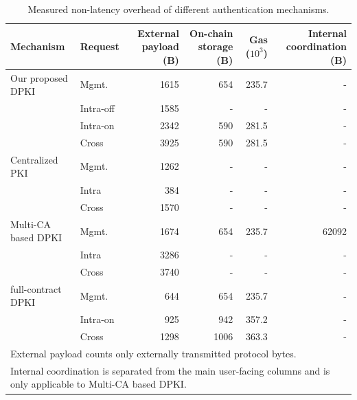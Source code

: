 \begin{table}[t]
\centering
\caption{Measured non-latency overhead of different authentication mechanisms.}
\label{tab:resource-overhead-v2}
\scriptsize
\setlength{\tabcolsep}{3.5pt}
\begin{tabular}{llrrrr}
\hline
Mechanism & Request & External payload (B) & On-chain storage (B) & Gas ($10^3$) & Internal coordination (B) \\
\hline
Our proposed DPKI & Mgmt. & 1615 & 654 & 235.7 & - \\
 & Intra-off & 1585 & - & - & - \\
 & Intra-on & 2342 & 590 & 281.5 & - \\
 & Cross & 3925 & 590 & 281.5 & - \\
Centralized PKI & Mgmt. & 1262 & - & - & - \\
 & Intra & 384 & - & - & - \\
 & Cross & 1570 & - & - & - \\
Multi-CA based DPKI & Mgmt. & 1674 & 654 & 235.7 & 62092 \\
 & Intra & 3286 & - & - & - \\
 & Cross & 3740 & - & - & - \\
full-contract DPKI & Mgmt. & 644 & 654 & 235.7 & - \\
 & Intra-on & 925 & 942 & 357.2 & - \\
 & Cross & 1298 & 1006 & 363.3 & - \\
\hline
\multicolumn{6}{l}{\footnotesize External payload counts only externally transmitted protocol bytes.}\\
\multicolumn{6}{l}{\footnotesize Internal coordination is separated from the main user-facing columns and is only applicable to Multi-CA based DPKI.}
\end{tabular}
\end{table}
